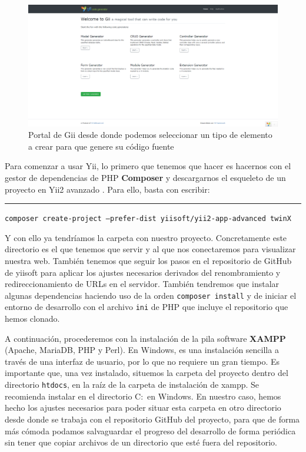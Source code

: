 \begin{figure}
	\centering
	\includegraphics[width=\textwidth]{gii}
	\caption[Portal de Gii]{Portal de Gii desde donde podemos seleccionar un tipo de elemento a crear para que genere su código fuente}
	\label{fig:gii}
\end{figure}


Para comenzar a usar Yii, lo primero que tenemos que hacer es hacernos con el gestor de dependencias de PHP \textbf{Composer} \cite{composer} y descargarnos el esqueleto de un proyecto en Yii2 avanzado \cite{yii2advanced}. Para ello, basta con escribir:

\par\noindent\rule{\textwidth}{0.4pt}
\texttt{composer create-project --prefer-dist yiisoft/yii2-app-advanced twinX}
\smallskip

Y con ello ya tendríamos la carpeta con nuestro proyecto. Concretamente este directorio es el que tenemos que servir y al que nos conectaremos para visualizar nuestra web. También tenemos que seguir los pasos en el repositorio de GitHub de yiisoft para aplicar los ajustes necesarios derivados del renombramiento y redireccionamiento de URLs en el servidor. También tendremos que instalar algunas dependencias haciendo uso de la orden \texttt{composer install} y de iniciar el entorno de desarrollo con el archivo \texttt{ini} de PHP que incluye el repositorio que hemos clonado.

A continuación, procederemos con la instalación de la pila software \textbf{XAMPP} (Apache, MariaDB, PHP y Perl). En Windows, es una instalación sencilla a través de una interfaz de usuario, por lo que no requiere un gran tiempo. Es importante que, una vez instalado, situemos la carpeta del proyecto dentro del directorio \texttt{htdocs}, en la raíz de la carpeta de instalación de xampp. Se recomienda instalar en el directorio C:\ en Windows. En nuestro caso, hemos hecho los ajustes necesarios para poder situar esta carpeta en otro directorio desde donde se trabaja con el repositorio GitHub del proyecto, para que de forma más cómoda podamos salvaguardar el progreso del desarrollo de forma periódica sin tener que copiar archivos de un directorio que esté fuera del repositorio.

